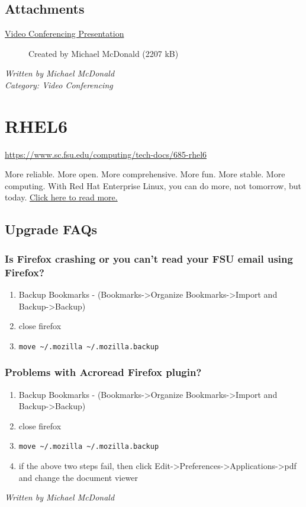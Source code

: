 \documentclass[12pt,a4paper]{article}
\begin{document}
\subsection*{Attachments}
\begin{description}
    \item[\href{https://www.sc.fsu.edu/computing/tech-docs/attachments/661-video-conferencing/Video_Conferencing.pdf}{Video Conferencing Presentation}] Created by Michael McDonald (2207 kB)
\end{description}
\hfill \textit{Written by Michael McDonald} \\
\hfill \textit{Category: Video Conferencing}

\section{RHEL6}
\url{https://www.sc.fsu.edu/computing/tech-docs/685-rhel6}

More reliable. More open. More comprehensive. More fun. More stable. More computing.
With Red Hat Enterprise Linux, you can do more, not tomorrow, but today.
\href{https://www.redhat.com/en/technologies/linux-platforms/enterprise-linux}{Click here to read more.}

\subsection*{Upgrade FAQs}
\subsubsection*{Is Firefox crashing or you can't read your FSU email using Firefox?}
\begin{enumerate}
    \item Backup Bookmarks - (Bookmarks->Organize Bookmarks->Import and Backup->Backup)
    \item close firefox
    \item \texttt{move \textasciitilde{}/.mozilla \textasciitilde{}/.mozilla.backup}
\end{enumerate}

\subsubsection*{Problems with Acroread Firefox plugin?}
\begin{enumerate}
    \item Backup Bookmarks - (Bookmarks->Organize Bookmarks->Import and Backup->Backup)
    \item close firefox
    \item \texttt{move \textasciitilde{}/.mozilla \textasciitilde{}/.mozilla.backup}
    \item if the above two steps fail, then click Edit->Preferences->Applications->pdf and change the document viewer
\end{enumerate}
\hfill \textit{Written by Michael McDonald}
\end{document}
